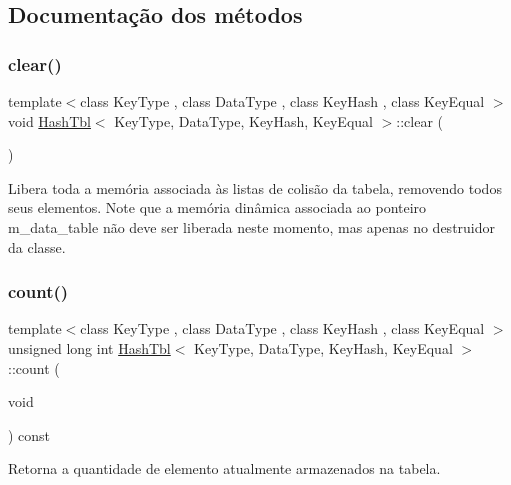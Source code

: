 \subsection{Documentação dos métodos}
\mbox{\label{classHashTbl_a633936911dbdc769be2dfdae84416e5a}} 
\subsubsection{\texorpdfstring{clear()}{clear()}}
{\footnotesize\ttfamily template$<$class Key\+Type , class Data\+Type , class Key\+Hash , class Key\+Equal $>$ \\
void \hyperlink{classHashTbl}{Hash\+Tbl}$<$ Key\+Type, Data\+Type, Key\+Hash, Key\+Equal $>$\+::clear (\begin{DoxyParamCaption}{ }\end{DoxyParamCaption})\hspace{0.3cm}{\ttfamily [inline]}}

Libera toda a memória associada às listas de colisão da tabela, removendo todos seus elementos. Note que a memória dinâmica associada ao ponteiro m\+\_\+data\+\_\+table não deve ser liberada neste momento, mas apenas no destruidor da classe. \mbox{\label{classHashTbl_ad5b97ce68300b96e51cc168bab5bd072}} 
\subsubsection{\texorpdfstring{count()}{count()}}
{\footnotesize\ttfamily template$<$class Key\+Type , class Data\+Type , class Key\+Hash , class Key\+Equal $>$ \\
unsigned long int \hyperlink{classHashTbl}{Hash\+Tbl}$<$ Key\+Type, Data\+Type, Key\+Hash, Key\+Equal $>$\+::count (\begin{DoxyParamCaption}\item[{void}]{ }\end{DoxyParamCaption}) const\hspace{0.3cm}{\ttfamily [inline]}}



Retorna a quantidade de elemento atualmente armazenados na tabela. 

\mbox{\label{classHashTbl_a71ce28f91782a9c92b1c87727668ba04}} 
